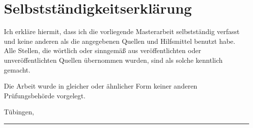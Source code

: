 \chapter*{Selbstst\"andigkeitserkl\"arung}

Ich erkl\"are hiermit, dass ich die vorliegende Masterarbeit selbstst\"andig verfasst und keine anderen als die angegebenen Quellen und Hilfsmittel benutzt habe. Alle Stellen, die w\"ortlich oder sinngem\"a{\ss} aus ver\"offentlichten oder unver\"offentlichten Quellen \"ubernommen wurden, sind als solche kenntlich gemacht.

Die Arbeit wurde in gleicher oder \"ahnlicher Form keiner anderen Pr\"ufungsbeh\"orde vorgelegt.

\vspace{2.2cm}

\noindent T\"ubingen, \ThesisDate

\vspace{1.6cm}

\noindent\rule{0.45\textwidth}{0.4pt}\\
\ThesisAuthor

\cleardoublepage
